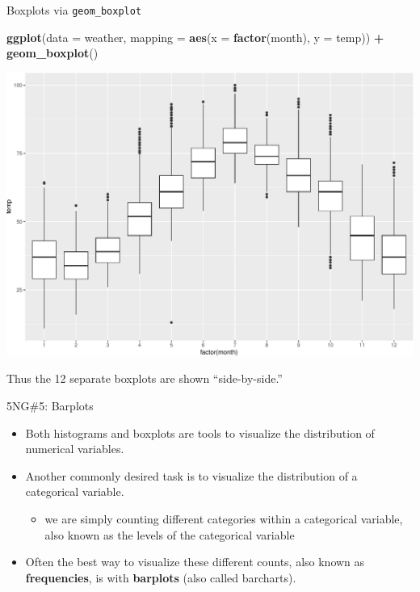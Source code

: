 \documentclass[
  ignorenonframetext,
]{beamer}
\newenvironment{Shaded}{\begin{snugshade}}{\end{snugshade}}
\newcommand{\AttributeTok}[1]{\textcolor[rgb]{0.13,0.29,0.53}{#1}}
\newcommand{\FunctionTok}[1]{\textcolor[rgb]{0.13,0.29,0.53}{\textbf{#1}}}
\newcommand{\NormalTok}[1]{#1}
\newcommand{\SpecialCharTok}[1]{\textcolor[rgb]{0.81,0.36,0.00}{\textbf{#1}}}
\providecommand{\tightlist}{%
  \setlength{\itemsep}{0pt}\setlength{\parskip}{0pt}}
\begin{document}
\begin{frame}[fragile]{Boxplots via \texttt{geom\_boxplot}}
\protect\hypertarget{boxplots-via-geom_boxplot}{}
\tiny

\begin{Shaded}
\begin{Highlighting}[]
\FunctionTok{ggplot}\NormalTok{(}\AttributeTok{data =}\NormalTok{ weather, }\AttributeTok{mapping =} \FunctionTok{aes}\NormalTok{(}\AttributeTok{x =} \FunctionTok{factor}\NormalTok{(month), }\AttributeTok{y =}\NormalTok{ temp)) }\SpecialCharTok{+}
  \FunctionTok{geom\_boxplot}\NormalTok{()}
\end{Highlighting}
\end{Shaded}

\begin{center}\includegraphics[width=0.9\linewidth,height=0.5\textheight]{Week2_files/figure-beamer/unnamed-chunk-35-1} \end{center}
\normalsize

Thus the 12 separate boxplots are shown ``side-by-side.''
\end{frame}

\begin{frame}{5NG\#5: Barplots}
\protect\hypertarget{ng5-barplots}{}
\begin{itemize}
\item
  Both histograms and boxplots are tools to visualize the distribution
  of numerical variables.
\item
  Another commonly desired task is to visualize the distribution of a
  categorical variable.

  \begin{itemize}
  \tightlist
  \item
    we are simply counting different categories within a categorical
    variable, also known as the levels of the categorical variable
  \end{itemize}
\item
  Often the best way to visualize these different counts, also known as
  \textbf{frequencies}, is with \textbf{barplots} (also called
  barcharts).
\end{itemize}
\end{frame}
\end{document}
